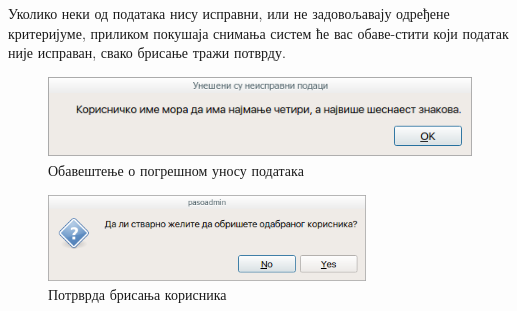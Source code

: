 \documentclass[a4paper, 12pt, diplomski]{etfcyr}
\begin{document}
\begin{justify}
					Уколико неки од података нису исправни, или не задовољавају одређене критеријуме, приликом покушаја снимања систем ће вас обаве-стити који податак није исправан, свако брисање тражи потврду.
					\begin{figure}[h]
						\begin{center}
							\includegraphics[width=1.0\textwidth]{manual/system_user_entry_error.png}
						\end{center}
						\caption{Обавештење о погрешном уносу података}
						\label{figure:system_user_entry_error}
					\end{figure}
					\begin{figure}[h]
						\begin{center}
							\includegraphics[width=0.75\textwidth]{manual/system_user_delete.png}
						\end{center}
						\caption{Потрврда брисања корисника}
						\label{figure:system_user_delete}
					\end{figure}
				\end{justify}

			\newpage
\end{document}
